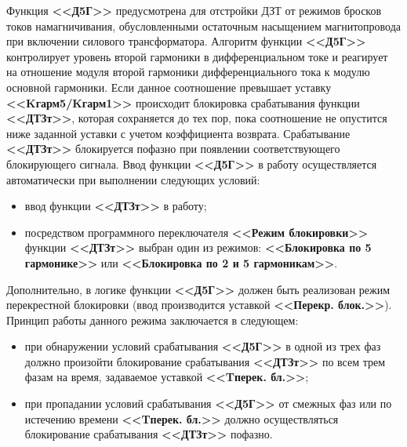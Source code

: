\begin{flushleft}
\color{black}
\nopagebreak
\end{flushleft}

\par
Функция \textbf{<<Д5Г>>} предусмотрена для отстройки ДЗТ от режимов бросков токов намагничивания, обусловленными остаточным насыщением магнитопровода при включении силового трансформатора. Алгоритм функции \textbf{<<Д5Г>>} контролирует уровень второй гармоники в дифференциальном токе и реагирует на отношение модуля второй гармоники дифференциального тока к модулю основной гармоники. Если данное соотношение превышает уставку \textbf{<<Kгарм5/Kгарм1>>} происходит блокировка срабатывания функции \textbf{<<ДТЗт>>}, которая сохраняется до тех пор, пока соотношение не опустится ниже заданной уставки с учетом коэффициента возврата. Срабатывание \textbf{<<ДТЗт>>} блокируется пофазно при появлении соответствующего блокирующего сигнала. Ввод функции \textbf{<<Д5Г>>} в работу осуществляется автоматически при выполнении следующих условий:
\begin{itemize}
\item ввод функции \textbf{<<ДТЗт>>} в работу; 
\item\sloppy посредством программного переключателя \textbf{<<Режим блокировки>>} функции \textbf{<<ДТЗт>>} выбран один из режимов: \textbf{<<Блокировка по 5 гармонике>>} или \textbf{<<Блокировка по 2 и 5 гармоникам>>}.
\end{itemize}
\par
Дополнительно, в логике функции \textbf{<<Д5Г>>} должен быть реализован режим перекрестной блокировки (ввод производится уставкой \textbf{<<Перекр. блок.>>}). Принцип работы данного режима заключается в следующем:
\begin{itemize}
\item при обнаружении условий срабатывания \textbf{<<Д5Г>>} в одной из трех фаз должно произойти блокирование срабатывания \textbf{<<ДТЗт>>} по всем трем фазам на время, задаваемое уставкой \textbf{<<Tперек. бл.>>};
\item при пропадании условий срабатывания \textbf{<<Д5Г>>} от смежных фаз или по истечению времени \textbf{<<Tперек. бл.>>} должно осуществляться блокирование срабатывания \textbf{<<ДТЗт>>} пофазно.
\end{itemize}

